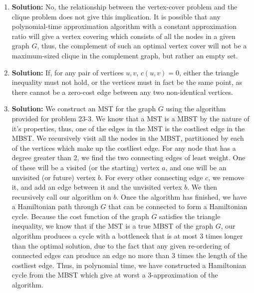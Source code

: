 \documentclass{article}
\begin{document}
\begin{enumerate}
    \item \textbf{Solution:}
    No, the relationship between the vertex-cover problem and the clique problem
    does not give this implication. It is possible that any polynomial-time
    approximation algorithm with a constant approximation ratio will give a
    vertex covering which consists of all the nodes in a given graph $G$, thus,
    the complement of such an optimal vertex cover will not be a maximum-sized
    clique in the complement graph, but rather an empty set.

    \item \textbf{Solution:}
    If, for any pair of vertices $u, v$, $c(u,v) = 0$, either the triangle
    inequality must not hold, or the vertices must in fact be the same point, as
    there cannot be a zero-cost edge between any two non-identical vertices.

    \item \textbf{Solution:}
    We construct an MST for the graph $G$ using the algorithm provided for
    problem 23-3. We know that a MST is a MBST by the nature of it's properties,
    thus, one of the edges in the MST is the costliest edge in the MBST. We
    recursively visit all the nodes in the MBST, partitioned by each of the
    vertices which make up the costliest edge. For any node that has a degree
    greater than 2, we find the two connecting edges of least weight. One of
    these will be a visited (or the starting) vertex $a$, and one will be an
    unvisited (or future) vertex $b$. For every other connecting edge $c$, we
    remove it, and add an edge between it and the unvisited vertex $b$. We then
    recursively call our algorithm on $b$. Once the algorithm has finished, we
    have a Hamiltonian path through $G$ that can be connected to form a
    Hamiltonian cycle. Because the cost function of the graph $G$ satisfies the
    triangle inequality, we know that if the MST is a true MBST of the graph
    $G$, our algorithm produces a cycle with a bottleneck that is at most 3
    times longer than the optimal solution, due to the fact that any given
    re-ordering of connected edges can produce an edge no more than 3 times the
    length of the costliest edge. Thus, in polynomial time, we have constructed
    a Hamiltonian cycle from the MBST which give at worst a 3-approximation of
    the algorithm.

\end{enumerate}
\end{document}
